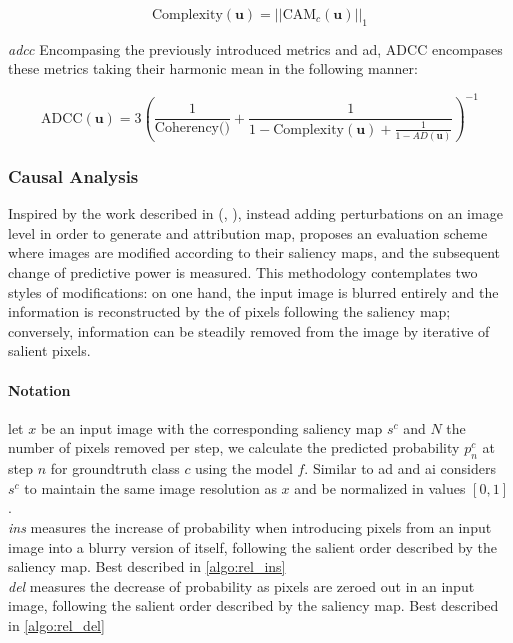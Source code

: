 \begin{equation}
	\mbox{Complexity}(\mathbf{u}) = ||\mbox{CAM}_c(\mathbf{u})||_1
\end{equation}

\emph{\gls{adcc}} Encompasing the previously introduced metrics and \gls{ad}, ADCC encompases 
these metrics taking their harmonic mean in the following manner:

\begin{equation}
	\mbox{ADCC}(\mathbf{u}) = 3\left(\frac{1}{\mbox{Coherency}(\mathbf)} + 
	                           \frac{1}{1-\mbox{Complexity}(\mathbf{u}) + 
							   \frac{1}{1-AD(\mathbf{u})}}\right)^{-1}
\end{equation}
\subsubsection{Causal Analysis} 
\label{sec:causal_metrics}
Inspired by the work described in (\cite{fong2017interpretable}, 
\cite{fong2019understanding}), instead adding perturbations on an image level in order to generate 
and attribution map, \cite{petsiuk2018rise} proposes an evaluation scheme where images are modified 
according to their saliency maps, and the subsequent change of predictive power is measured. This 
methodology contemplates two styles of modifications: on one hand, the input image is blurred 
entirely and the information is reconstructed by the  of pixels following the 
saliency map; conversely, information can be steadily removed from the image by iterative
 of salient pixels.\\

\paragraph{Notation} let $x$ be an input image with the corresponding saliency map $s^c$ and $N$ the 
number of pixels removed per step, we calculate the predicted probability $p^c_n$ at step $n$ for 
groundtruth class $c$ using the model $f$.  Similar to \gls{ad} and \gls{ai} \cite{petsiuk2018rise} 
considers $s^c$ to maintain the same image resolution as $x$ and be normalized in values $[0,1]$.\\

\emph{\gls{ins}} measures the increase of probability when introducing pixels from an input image 
into a blurry version of itself, following the salient order described by the saliency map. Best 
described in \autoref{algo:rel_ins}\\

\emph{\gls{del}} measures the decrease of probability as pixels are zeroed out in an input image, 
following the salient order described by the saliency map. Best 
described in \autoref{algo:rel_del}\\

